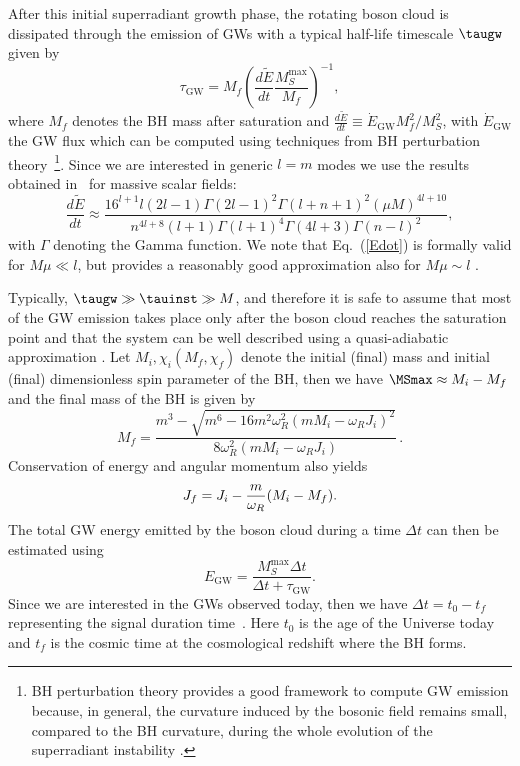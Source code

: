 \documentclass[
reprint,           %
superscriptaddress,%
amsmath,           %
amssymb,           %
aps,               %
prd,               %
notitlepage,       %
floatfix,          %
nofootinbib %
]{revtex4-1}
\def\e{\begin{equation}}
\def\q{\end{equation}}
\begin{document}
After this initial superradiant growth phase, the rotating boson cloud is dissipated through the emission of GWs with a typical half-life timescale $\taugw$ given by
\e
\tau_{\mathrm{GW}} = M_{f}\left(\frac{d \tilde{E}}{d t} \frac{M_{S}^{\max }}{M_{f}}\right)^{-1},
\q
where $M_f$ denotes the BH mass after saturation and $\frac{d \tilde{E}}{d t}\equiv \dot{E}_\text{GW} M_f^2/M_S^2$, with $\dot{E}_\text{GW}$ the GW flux which can be computed using techniques from BH perturbation theory~\cite{Yoshino:2013ofa,Brito:2017zvb,Siemonsen:2019ebd}\footnote{BH perturbation theory provides a good framework to compute GW emission because, in general, the curvature induced by the bosonic field remains small, compared to the BH curvature, during the whole evolution of the superradiant instability \cite{Brito:2014wla,East:2017ovw,Herdeiro:2017phl}.}. Since we are interested in generic $l=m$ modes we use the results obtained in~\cite{Yoshino:2013ofa} for massive scalar fields:
%
\e\label{Edot}
	\frac{d \tilde{E}}{d t}\approx\frac
	{
		16^{l+1} l(2 l-1) \Gamma(2 l-1)^{2} \Gamma(l+n+1)^{2}
		(\mu M)^{4l+10}
	}
	{
	n^{4 l+8}(l+1) \Gamma(l+1)^{4} \Gamma(4 l+3) \Gamma(n-l)^{2}
	},
\q
with $\Gamma$ denoting the Gamma function. We note that Eq.~(\ref{Edot}) is formally valid for $M\mu\ll l$, but provides a reasonably good approximation also for $M\mu \sim l$ \cite{Yoshino:2013ofa}.

Typically, $\taugw \gg \tauinst \gg M$, and therefore it is safe to assume that most of the GW emission takes place only after the boson cloud reaches the saturation point and that the system can be well described using a quasi-adiabatic approximation \cite{Brito:2014wla}. Let $M_i,\chi_i(M_f,\chi_f)$ denote the initial (final) mass and initial (final) dimensionless spin parameter of the BH, then we have $\MSmax\approx M_i-M_f$ and the final mass of the BH is given by \cite{Tsukada:2018mbp}
\e
M_{f}=\frac{m^{3}-\sqrt{m^{6}-16 m^{2} \omega_{R}^{2}\left(m M_{i}-\omega_{R} J_{i}\right)^{2}}}{8 \omega_{R}^{2}\left(m M_{i}-\omega_{R} J_{i}\right)}\,.
\q
Conservation of energy and angular momentum also yields
\e
J_f = J_i -{m\over \omega_R}(M_i-M_f).
\q
The total GW energy emitted by the boson cloud during a time $\Delta t$ can then be estimated using \cite{Brito:2017zvb}
\e\label{eq:energy}
E_{\mathrm{GW}}=\frac{M_{S}^{\max } \Delta t}{\Delta t+\tau_{\mathrm{GW}}}.
\q
Since we are interested in the GWs observed today, then we have $\Delta t=t_0-t_f$ representing the signal duration time~\cite{Tsukada:2020lgt}. Here $t_0$ is the age of the Universe today and $t_f$ is the cosmic time at the cosmological redshift where the BH forms.
\end{document}
